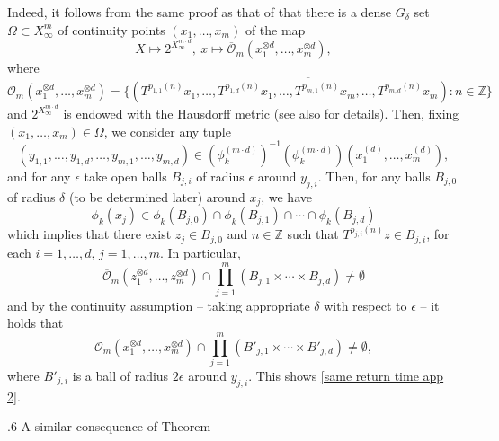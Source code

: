 \documentclass[reqno]{amsart}
\makeatletter
\def\Z{{\mathbb Z}}
\theoremstyle{definition}
\def\subsection{\@startsection{subsection}{2}%
  \z@{.4\linespacing\@plus.7\linespacing}
{.6\baselineskip}%
  {\normalfont\centering\bfseries}%
}
\theoremstyle{remark}
\makeatother
\begin{document}
Indeed, it follows from the same proof as that of \cite[Lemma 3.6]{Huang_Shao_Ye} that there is a dense $G_{\delta}$ set $\Omega \subset X_{\infty}^m$ of continuity points $(x_1,\ldots,x_m)$ of the map 
$$X\mapsto 2^{X_{\infty}^{m\cdot d}},\ x\mapsto \overline{\mathcal{O}}_{m}(x_1^{\otimes d},\ldots,x_m^{\otimes d}),$$
where 
$$\overline{\mathcal{O}}_{m}(x_1^{\otimes d},\ldots,x_m^{\otimes d})=\overline{\{(T^{p_{1,1}(n)}x_1,\ldots,T^{p_{1,d}(n)}x_1,\ldots,T^{p_{m,1}(n)}x_m,\ldots,T^{p_{m,d}(n)}x_m):n\in \Z\}}$$
and $2^{X_{\infty}^{m\cdot d}}$ is endowed with the Hausdorff metric (see also \cite[Section 2.4.1]{Huang_Shao_Ye} for details). Then, fixing $(x_1,\ldots,x_m)\in \Omega$, we consider any tuple $$(y_{1,1},\ldots,y_{1,d},\ldots,y_{m,1},\ldots,y_{m,d})\in(\phi_k^{(m\cdot d)})^{-1}(\phi_k^{(m\cdot d)})(x_1^{(d)},\ldots,x_m^{(d)}),$$
and for any $\epsilon$ take open balls $B_{j,i}$ of radius $\epsilon$ around $y_{j,i}$. Then, for any balls $B_{j,0}$ of radius $\delta$ (to be determined later) around $x_j$, we have
$$\phi_k(x_j)\in \phi_k(B_{j,0})\cap \phi_k(B_{j,1})\cap \cdots \cap \phi_k(B_{j,d})$$
which implies that there exist $z_j\in B_{j,0}$ and $n\in \Z$ such that
$T^{p_{j,i}(n)}z\in B_{j,i}$, for each 
$i=1,\ldots,d$, $j=1,\ldots,m$. In particular,
$$\overline{\mathcal{O}}_{m}(z_1^{\otimes d},\ldots,z_m^{\otimes d}) \cap \prod_{j=1}^m (B_{j,1}\times \cdots \times B_{j,d}) \neq \emptyset$$
and by the continuity assumption -- taking appropriate $\delta$ with respect to $\epsilon$ --
it holds that
$$\overline{\mathcal{O}}_{m}(x_1^{\otimes d},\ldots,x_m^{\otimes d}) \cap \prod_{j=1}^m (B'_{j,1}\times \cdots \times B'_{j,d}) \neq \emptyset,$$
where $B'_{j,i}$ is a ball of radius $2\epsilon$ 
around $y_{j,i}$. This shows \eqref{same return time app 2}.

\subsection{A similar consequence of Theorem \cite[Theorem 3.4]{GKLMRR}}
\end{document}
